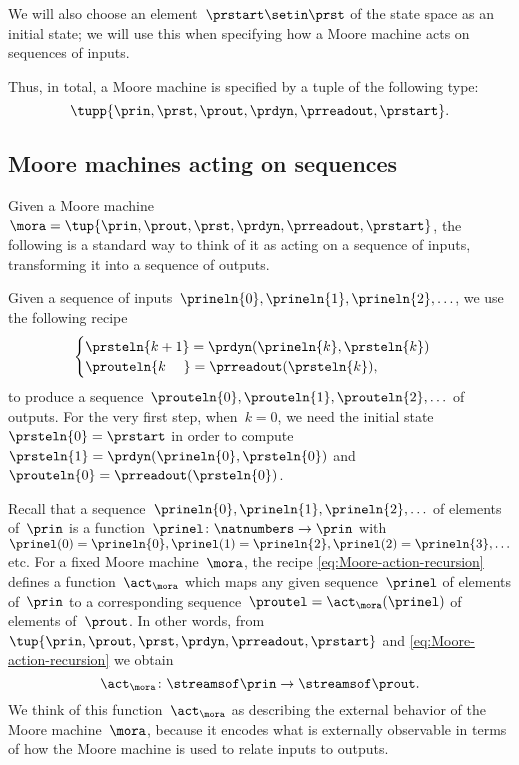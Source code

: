 We will also choose an element~$\prstart \setin \prst$ of the state space as an initial state; we will use this when specifying how a Moore machine acts on sequences of inputs.

Thus, in total, a Moore machine is specified by a tuple of the following type:
\begin{equation}
    \label{eq:moore-tuple}
    \tupp{\prin,\prst,\prout,\prdyn,\prreadout,\prstart}.
\end{equation}


\subsection{Moore machines acting on sequences}

Given a Moore machine~$\mora = \tup{\prin, \prout, \prst, \prdyn, \prreadout, \prstart}$, the following is a standard way to think of it as acting on a sequence of inputs, transforming it into a sequence of outputs.

Given a sequence of inputs~$\prineln{0}, \prineln{1}, \prineln{2}, \ldots $, we use the following recipe
\begin{equation}
    \label{eq:Moore-action-recursion}
    \begin{cases}
        \prsteln{k+1} = \prdyn(\prineln{k}, \prsteln{k}) \\
        \prouteln{k\phantom{+1}}   = \prreadout(\prsteln{k}),
    \end{cases}
\end{equation}
to produce a sequence~$\prouteln{0}, \prouteln{1}, \prouteln{2}, \ldots$ of outputs.
For the very first step, when~$k = 0$, we need the initial state~$\prsteln{0} = \prstart$ in order to compute~$\prsteln{1} = \prdyn(\prineln{0}, \prsteln{0})$ and~$\prouteln{0} = \prreadout(\prsteln{0})$.


Recall that a sequence~$\prineln{0}, \prineln{1}, \prineln{2}, \ldots$ of elements of~$\prin$ is a function~$\prinel \colon \natnumbers \to \prin$ with~$\prinel(0) = \prineln{0}, \prinel(1) = \prineln{2}, \prinel(2) = \prineln{3}, \ldots$ etc.
For a fixed Moore machine~$\mora$, the recipe \cref{eq:Moore-action-recursion} defines a function~$\act_\mora$ which maps any given sequence~$\prinel$ of elements of~$\prin$ to a corresponding sequence~$\proutel = \act_\mora(\prinel)$ of elements of~$\prout$.
In other words, from~$\tup{\prin, \prout, \prst, \prdyn, \prreadout, \prstart}$ and \cref{eq:Moore-action-recursion} we obtain
\begin{equation}
    \act_\mora \colon \streamsof\prin  \to \streamsof\prout.
\end{equation}
We think of this function~$\act_\mora$ as describing the external behavior of the Moore machine~$\mora$, because it encodes what is externally observable in terms of how the Moore machine is used to relate inputs to outputs.

